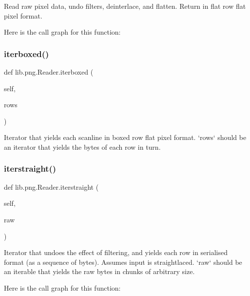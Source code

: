 \begin{DoxyVerb}Read raw pixel data, undo filters, deinterlace, and flatten.
Return in flat row flat pixel format.
\end{DoxyVerb}
 Here is the call graph for this function\+:
\mbox{\label{classlib_1_1png_1_1_reader_a5e9f2064e8d50af178d6e8d5aea74b47}} 
\subsubsection{\texorpdfstring{iterboxed()}{iterboxed()}}
{\footnotesize\ttfamily def lib.\+png.\+Reader.\+iterboxed (\begin{DoxyParamCaption}\item[{}]{self,  }\item[{}]{rows }\end{DoxyParamCaption})}

\begin{DoxyVerb}Iterator that yields each scanline in boxed row flat pixel
format.  `rows` should be an iterator that yields the bytes of
each row in turn.
\end{DoxyVerb}
 \mbox{\label{classlib_1_1png_1_1_reader_a46a25b00de431ed820a6624870aaff90}} 
\subsubsection{\texorpdfstring{iterstraight()}{iterstraight()}}
{\footnotesize\ttfamily def lib.\+png.\+Reader.\+iterstraight (\begin{DoxyParamCaption}\item[{}]{self,  }\item[{}]{raw }\end{DoxyParamCaption})}

\begin{DoxyVerb}Iterator that undoes the effect of filtering, and yields
each row in serialised format (as a sequence of bytes).
Assumes input is straightlaced.  `raw` should be an iterable
that yields the raw bytes in chunks of arbitrary size.
\end{DoxyVerb}
 Here is the call graph for this function\+:
\mbox{\label{classlib_1_1png_1_1_reader_a68fbc2d1cdf23f0844ab0b40fe4f0803}} 
